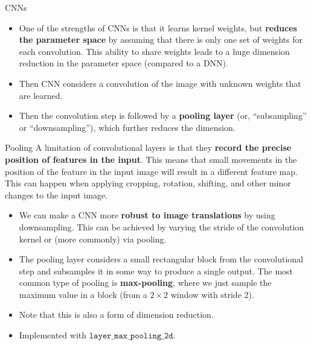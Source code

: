 \documentclass{beamer}
\begin{document}
\begin{frame}{CNNs}
\begin{itemize}
\item One of the strengths of CNNs is that it learns kernel weights, but \textbf{reduces the parameter space} by assuming that there is only one set of weights for each convolution. This ability to share weights leads to a huge dimension reduction in the parameter space (compared to a DNN).
\item Then CNN considers a convolution of the image with unknown weights that are learned.
\item Then the convolution step is followed by a \textbf{pooling layer} (or, ``subsampling'' or ``downsampling''), which further reduces the dimension.
\end{itemize}
\end{frame}

\begin{frame}{Pooling}
A limitation of convolutional layers is that they \textbf{record the precise position of features in the input}. This means that small movements in the position of the feature in the input image will result in a different feature map. This can happen when applying cropping, rotation, shifting, and other minor changes to the input image.
\begin{itemize}
\item We can make a CNN more \textbf{robust to image translations} by using downsampling. This can be achieved by varying the stride of the convolution kernel or (more commonly) via pooling.
\item The pooling layer considers a small rectangular block from the convolutional step and subsamples it in some way to produce a single output. The most common type of pooling is \textbf{max-pooling}, where we just sample the maximum value in a block (from a $2\times 2$ window with stride 2).
\item Note that this is also a form of dimension reduction.
\item Implemented with $\texttt{layer\_max\_pooling\_2d}$.
\end{itemize}
\end{frame}
\end{document}
